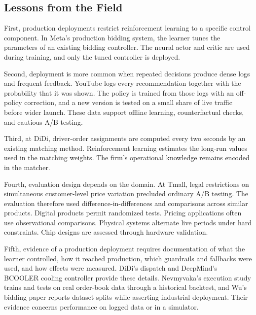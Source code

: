 



\subsection{Lessons from the Field}
\label{sec:field_lessons}

First, production deployments restrict reinforcement learning to a specific control component. In Meta's production bidding system, the learner tunes the parameters of an existing bidding controller. The neural actor and critic are used during training, and only the tuned controller is deployed.

Second, deployment is more common when repeated decisions produce dense logs and frequent feedback. YouTube logs every recommendation together with the probability that it was shown. The policy is trained from those logs with an off-policy correction, and a new version is tested on a small share of live traffic before wider launch. These data support offline learning, counterfactual checks, and cautious A/B testing.

Third, at DiDi, driver-order assignments are computed every two seconds by an existing matching method. Reinforcement learning estimates the long-run values used in the matching weights. The firm's operational knowledge remains encoded in the matcher.

Fourth, evaluation design depends on the domain. At Tmall, legal restrictions on simultaneous customer-level price variation precluded ordinary A/B testing. The evaluation therefore used difference-in-differences and comparisons across similar products. Digital products permit randomized tests. Pricing applications often use observational comparisons. Physical systems alternate live periods under hard constraints. Chip designs are assessed through hardware validation.

Fifth, evidence of a production deployment requires documentation of what the learner controlled, how it reached production, which guardrails and fallbacks were used, and how effects were measured. DiDi's dispatch and DeepMind's BCOOLER cooling controller provide these details. Nevmyvaka's execution study trains and tests on real order-book data through a historical backtest, and Wu's bidding paper reports dataset splits while asserting industrial deployment. Their evidence concerns performance on logged data or in a simulator.

